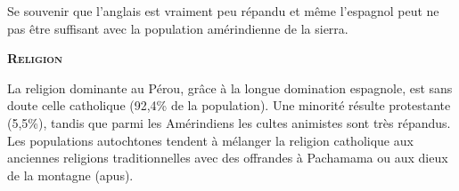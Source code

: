 \begin{multicols}{2}
Se souvenir que l'anglais est vraiment peu répandu et même l'espagnol peut ne pas être suffisant avec la population amérindienne de la sierra.

\textbf{\textsc{Religion}}

La religion dominante au Pérou, grâce à la longue domination espagnole, est sans doute celle catholique (92,4\% de la population). Une minorité résulte protestante (5,5\%), tandis que parmi les Amérindiens les cultes animistes sont très répandus. Les populations autochtones tendent à mélanger la religion catholique aux anciennes religions traditionnelles avec des offrandes à Pachamama ou aux dieux de la montagne (apus).

\end{multicols}



\vfill
